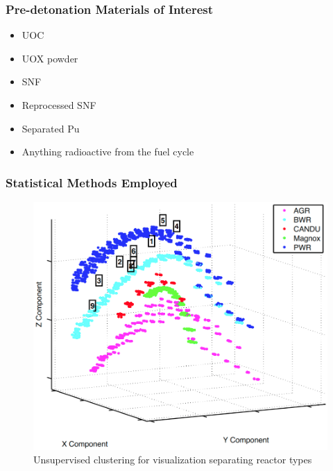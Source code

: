
\begin{frame}
  \frametitle{Pre-detonation Materials of Interest}
  \begin{itemize}
    \item UOC
    \item UOX powder
    \item SNF
    \item Reprocessed SNF
    \item Separated Pu
    \item Anything radioactive from the fuel cycle
  \end{itemize}
\end{frame}

\begin{frame}
  \frametitle{Statistical Methods Employed}
  \begin{minipage}[t]{0.45\textwidth}
    \begin{figure}
      \raggedleft
      \includegraphics[width=1\linewidth]{./figures/sfcompo.png}
      \caption{Unsupervised clustering for visualization separating reactor types \cite{jones_viz_2014}}
    \end{figure}
  \end{minipage}\hfill
  \begin{minipage}[t]{0.45\textwidth}
    \begin{figure}
      \raggedright

\end{figure}
\end{minipage}
\end{frame}

